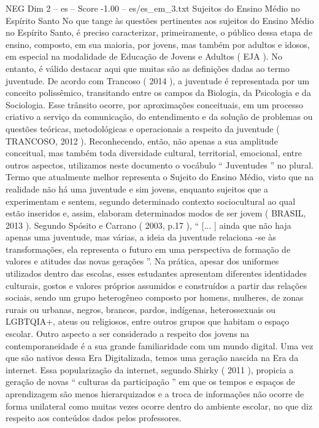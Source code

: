 \begin{textsample}{NEG Dim 2 – es – Score -1.00 – es/es\_em\_3.txt}  \label{ex:f2_neg_073}
Sujeitos do Ensino Médio no Espírito Santo No que tange às questões pertinentes aos sujeitos do Ensino Médio no Espírito Santo, é preciso caracterizar, primeiramente, o público dessa etapa de ensino, composto, em sua maioria, por jovens, mas também por adultos e idosos, em especial na modalidade de Educação de Jovens e Adultos ( EJA ).
No entanto, é válido destacar aqui que muitas são as definições dadas ao termo juventude.
De acordo com Trancoso ( 2014 ), a juventude é representada por um conceito polissêmico, transitando entre os campos da Biologia, da Psicologia e da Sociologia.
Esse trânsito ocorre, por aproximações conceituais, em um processo criativo a serviço da comunicação, do entendimento e da solução de problemas ou questões teóricas, metodológicas e operacionais a respeito da juventude ( TRANCOSO, 2012 ).
Reconhecendo, então, não apenas a sua amplitude conceitual, mas também toda diversidade cultural, territorial, emocional, entre outros aspectos, utilizamos neste documento o vocábulo “ Juventudes ” no plural.
Termo que atualmente melhor representa o Sujeito do Ensino Médio, visto que na realidade não há uma juventude e sim jovens, enquanto sujeitos que a experimentam e sentem, segundo determinado contexto sociocultural ao qual estão inseridos e, assim, elaboram determinados modos de ser jovem ( BRASIL, 2013 ).
Segundo Spósito e Carrano ( 2003, p.17 ), “ [... ] ainda que não haja apenas uma juventude, mas várias, a ideia da juventude relaciona -se às transformações, ela representa o futuro em uma perspectiva de formação de valores e atitudes das novas gerações ”.
Na prática, apesar dos uniformes utilizados dentro das escolas, esses estudantes apresentam diferentes identidades culturais, gostos e valores próprios assumidos e construídos a partir das relações sociais, sendo um grupo heterogêneo composto por homens, mulheres, de zonas rurais ou urbanas, negros, brancos, pardos, indígenas, heterossexuais ou LGBTQIA+, ateus ou religiosos, entre outros grupos que habitam o espaço escolar.
Outro aspecto a ser considerado a respeito dos jovens na contemporaneidade é a sua grande familiaridade com um mundo digital.
Uma vez que são nativos dessa Era Digitalizada, temos uma geração nascida na Era da internet.
Essa popularização da internet, segundo Shirky ( 2011 ), propicia a geração de novas “ culturas da participação ” em que os tempos e espaços de aprendizagem são menos hierarquizados e a troca de informações não ocorre de forma unilateral como muitas vezes ocorre dentro do ambiente escolar, no que diz respeito aos conteúdos dados pelos professores.

\end{textsample}
